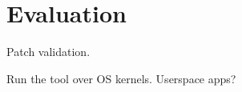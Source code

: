 \section{Evaluation}
\label{s:eval}

Patch validation.

Run the tool over OS kernels.  Userspace apps?
